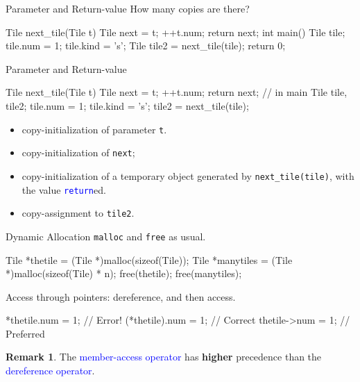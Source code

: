 \documentclass{beamer}
\newcommand{\blue}[1]{\textcolor{blue}{#1}}
\newcommand{\ttt}[1]{\texttt{#1}}
\newcommand{\bluett}[1]{\blue{\ttt{#1}}}
\theoremstyle{definition}
\newtheorem{rmk}{Remark}
\begin{document}
\begin{frame}[fragile]{Parameter and Return-value}
    How many copies are there?
    \begin{cpp}
Tile next_tile(Tile t) {
  Tile next = t;
  ++t.num;
  return next;
}
int main() {
  Tile tile;
  tile.num = 1;
  tile.kind = 's';
  Tile tile2 = next_tile(tile);
  return 0;
}
    \end{cpp}
\end{frame}

\begin{frame}[fragile]{Parameter and Return-value}
    \begin{cpp}
Tile next_tile(Tile t) {
  Tile next = t;
  ++t.num;
  return next;
}
// in main
Tile tile, tile2;
tile.num = 1; tile.kind = 's';
tile2 = next_tile(tile);
    \end{cpp}
    \begin{itemize}
        \item copy-initialization of parameter \ttt{t}.
        \item copy-initialization of \ttt{next};
        \item copy-initialization of a temporary object generated by \ttt{next\_tile(tile)}, with the value \bluett{return}ed.
        \item copy-assignment to \ttt{tile2}.
    \end{itemize}
\end{frame}

\begin{frame}[fragile]{Dynamic Allocation}
    \ttt{malloc} and \ttt{free} as usual.
    \begin{cpp}
Tile *thetile
  = (Tile *)malloc(sizeof(Tile));
Tile *manytiles
  = (Tile *)malloc(sizeof(Tile) * n);
free(thetile); free(manytiles);
    \end{cpp}
    \pause
    Access through pointers: dereference, and then access.
    \begin{cpp}
*thetile.num = 1;   // Error!
(*thetile).num = 1; // Correct
thetile->num = 1;   // Preferred
    \end{cpp}
    \begin{rmk}
        The \blue{member-access operator} has \textbf{higher} precedence than the \blue{dereference operator}.
    \end{rmk}
\end{frame}
\end{document}
